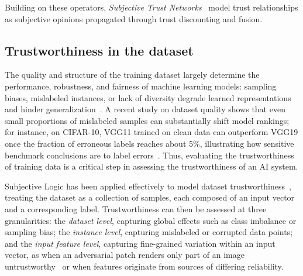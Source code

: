 Building on these operators, \emph{Subjective Trust Networks}~\cite{4622580,10.1007/978-3-032-08887-1_4} model trust relationships as subjective opinions propagated through trust discounting and fusion. 

\vspace{-0.5em}
\subsection{Trustworthiness in the dataset}\label{sec:backtwdt}

The quality and structure of the training dataset largely determine the performance, robustness, and fairness of machine learning models: sampling biases, mislabeled instances, or lack of diversity degrade learned representations and hinder generalization~\cite{arp2021dosdontsmachinelearning}. A recent study on dataset quality shows that even small proportions of mislabeled samples can substantially shift model rankings; for instance, on CIFAR-10, VGG11 trained on clean data can outperform VGG19 once the fraction of erroneous labels reaches about 5\%, illustrating how sensitive benchmark conclusions are to label errors~\cite{northcutt2021pervasivelabelerrorstest}. Thus, evaluating the trustworthiness of training data is a critical step in assessing the trustworthiness of an AI system. 

Subjective Logic has been applied effectively to model dataset trustworthiness~\cite{10.1007/978-3-032-19096-3_17,trust-aidatatrust}, treating the dataset as a collection of samples, each composed of an input vector and a corresponding label. Trustworthiness can then be assessed at three granularities: the \emph{dataset level}, capturing global effects such as class imbalance or sampling bias; the \emph{instance level}, capturing mislabeled or corrupted data points; and the \emph{input feature level}, capturing fine-grained variation within an input vector, as when an adversarial patch renders only part of an image untrustworthy~\cite{Vargas2020} or when features originate from sources of differing reliability.

